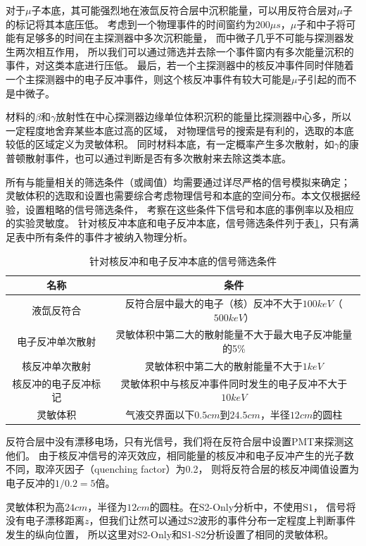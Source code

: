 对于$\mu$子本底，其可能强烈地在液氙反符合层中沉积能量，可以用反符合层对$\mu$子的标记将其本底压低。
考虑到一个物理事件的时间窗约为$200\mu s$，$\mu$子和中子将可能有足够多的时间在主探测器中多次沉积能量，
而中微子几乎不可能与探测器发生两次相互作用，
所以我们可以通过筛选并去除一个事件窗内有多次能量沉积的事件，对这类本底进行压低。
最后，若一个主探测器中的核反冲事件同时伴随着一个主探测器中的电子反冲事件，则这个核反冲事件有较大可能是$\mu$子引起的而不是中微子。

材料的$\beta$和$\gamma$放射性在中心探测器边缘单位体积沉积的能量比探测器中心多，所以一定程度地舍弃某些本底过高的区域，
对物理信号的搜索是有利的，选取的本底较低的区域定义为灵敏体积。
同时材料本底，有一定概率产生多次散射，如$\gamma$的康普顿散射事件，也可以通过判断是否有多次散射来去除这类本底。

所有与能量相关的筛选条件（或阈值）均需要通过详尽严格的信号模拟来确定；
灵敏体积的选取和设置也需要综合考虑物理信号和本底的空间分布。本文仅根据经验，设置粗略的信号筛选条件，
考察在这些条件下信号和本底的事例率以及相应的实验灵敏度。
针对核反冲本底和电子反冲本底，信号筛选条件列于表\ref{tab:cuts}，只有满足表中所有条件的事件才被纳入物理分析。

\begin{table}
  \centering
  \caption{针对核反冲和电子反冲本底的信号筛选条件}
  \begin{tabular}{cc}
    \toprule
    名称 & 条件 \\
    \midrule
    液氙反符合 & 反符合层中最大的电子（核）反冲不大于$100\si{keV}$（$500\si{keV}$） \\
    电子反冲单次散射 & 灵敏体积中第二大的散射能量不大于最大电子反冲能量的5\% \\
    核反冲单次散射 & 灵敏体积中第二大的散射能量不大于$1\si{keV}$ \\
    核反冲的电子反冲标记 & 灵敏体积中与核反冲事件同时发生的电子反冲不大于$10\si{keV}$ \\
    灵敏体积 & 气液交界面以下$0.5\si{cm}$到$24.5\si{cm}$，半径$12\si{cm}$的圆柱 \\
    \bottomrule
  \end{tabular}
  \label{tab:cuts}
\end{table}

反符合层中没有漂移电场，只有光信号，我们将在反符合层中设置PMT来探测这他们。
由于核反冲信号的淬灭效应，相同能量的核反冲和电子反冲产生的光子数不同，取淬灭因子（quenching factor）为0.2，
则将反符合层的核反冲阈值设置为电子反冲的$1/0.2=5$倍。

灵敏体积为高$24\si{cm}$，半径为$12\si{cm}$的圆柱。在S2-Only分析中，不使用$\mathrm{S1}$，
信号将没有电子漂移距离$z$，但我们让然可以通过$\mathrm{S2}$波形的事件分布一定程度上判断事件发生的纵向位置，
所以这里对S2-Only和S1-S2分析设置了相同的灵敏体积。

